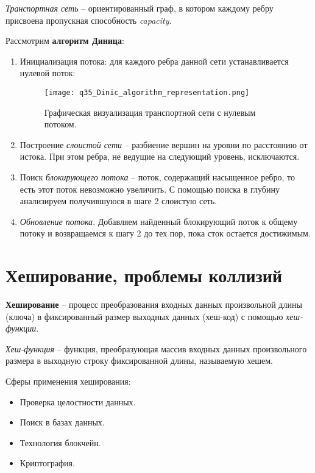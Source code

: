 \textit{Транспортная сеть} -- ориентированный граф, в котором каждому ребру присвоена пропускная способность \textit{capacity}.
\vspace{10pt}

Рассмотрим \textbf{алгоритм Диница}:
\begin{enumerate}[font=\footnotesize, noitemsep, topsep=0pt, , partopsep=0pt]
	\item Инициализация потока: для каждого ребра данной сети устанавливается нулевой поток:
	\begin{figure}[htbp]
		\centering
		\texttt{[image: q35\_Dinic\_algorithm\_representation.png]}
		\caption{Графическая визуализация транспортной сети с нулевым потоком.}
	\end{figure}
	\item Построение \textit{слоистой сети} -- разбиение вершин на уровни по расстоянию от истока. При этом ребра, не ведущие на следующий уровень, исключаются.
	\item Поиск \textit{блокирующего потока} -- поток, содержащий насыщенное ребро, то есть этот поток невозможно увеличить. С помощью поиска в глубину анализируем получившуюся в шаге 2 слоистую сеть.
	\item \textit{Обновление потока}. Добавляем найденный блокирующий поток к общему потоку и возвращаемся к шагу 2 до тех пор, пока сток остается достижимым.
\end{enumerate}
\vspace{50pt}



\section{Хеширование, проблемы коллизий}
\textbf{Хеширование} -- процесс преобразования входных данных произвольной длины (ключа) в фиксированный размер выходных данных (хеш-код) с помощью \textit{хеш-функции}.\par
\textit{Хеш-функция} -- функция, преобразующая массив входных данных произвольного размера в выходную строку фиксированной длины, называемую хешем.
\vspace{5pt}

Сферы применения хеширования:
\begin{itemize}[label=$\triangleright$, font=\scriptsize, noitemsep, topsep=0pt, , partopsep=0pt]
	\item {\footnotesize Проверка целостности данных.}
	\item {\footnotesize Поиск в базах данных.}
	\item {\footnotesize Технология блокчейн.}
	\item {\footnotesize Криптография.}
\end{itemize}
\vspace{5pt}

